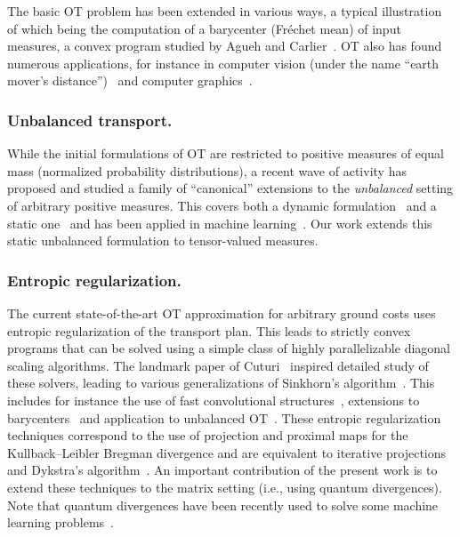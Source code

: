 The basic OT problem has been extended in various ways, a typical illustration of which being the computation of a barycenter (Fr\'echet mean) of input measures, a convex program studied by Agueh and Carlier~.
%
OT also has found numerous applications, for instance in computer vision (under the name ``earth mover's distance'')~\cite{rubner-2000} and computer graphics~\cite{bonneel-2011}. %


\subsubsection{Unbalanced transport.}

While the initial formulations of OT are restricted to positive measures of equal mass (normalized probability distributions), a recent wave of activity has proposed and studied a family of ``canonical'' extensions %
to the \emph{unbalanced} setting of arbitrary positive measures. This covers both a dynamic formulation~\cite{LieroMielkeSavareCourt,kondratyev2015,2016-chizat-focm} and a static one~\cite{LieroMielkeSavareLong,2015-chizat-unbalanced} and has been applied in machine learning~\cite{frogner-2015}. 
%
Our work extends this static unbalanced formulation to tensor-valued measures. 


\subsubsection{Entropic regularization.}

The current state-of-the-art OT approximation for arbitrary ground costs uses entropic regularization of the transport plan. This leads to strictly convex programs that can be solved using a simple class of highly parallelizable diagonal scaling algorithms. The landmark paper of Cuturi~ inspired detailed study of these solvers, leading to various generalizations of Sinkhorn's algorithm~. This includes for instance the use of fast convolutional structures~\cite{solomon-2015}, extensions to barycenters~\cite{benamou-2015} and application to unbalanced OT~\cite{frogner-2015,2016-chizat-sinkhorn}.
%
These entropic regularization techniques correspond to the use of projection and proximal maps for the Kullback--Leibler Bregman divergence and are equivalent to iterative projections~\cite{bregman-1967} and Dykstra's algorithm~\cite{Dykstra83,bauschke-lewis}. 
%
An important contribution of the present work is to extend these techniques to the matrix setting (i.e., using quantum divergences). Note that quantum divergences have been recently used to solve some machine learning problems~\cite{Dhillon2008,Kulis2009,Chandrasekaran2016}.%


